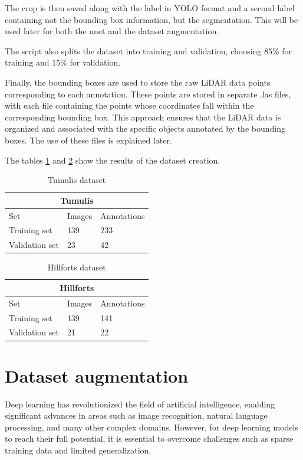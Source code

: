 The crop is then saved along with the label in YOLO format and a second label containing not the bounding box information, but the segmentation. This will be used later for both the unet and the dataset augmentation.

The script also splits the dataset into training and validation, choosing 85\% for training and 15\% for validation.

Finally, the bounding boxes are used to store the raw LiDAR data points corresponding to each annotation. These points are stored in separate .las files, with each file containing the points whose coordinates fall within the corresponding bounding box. This approach ensures that the LiDAR data is organized and associated with the specific objects annotated by the bounding boxes. The use of these files is explained later.

The tables \ref{table:tumulisDataset} and \ref{table:hillfortsDataset} show the results of the dataset creation.

\begin{table}[H]
\centering
\begin{tabular}{|p{3cm}|p{2.5cm}|p{2cm}|} 
\hline
\multicolumn{3}{|c|}{Tumulis} \\
 \hline
  Set & Images & Annotations\\ [0.5ex] 
 \hline
 Training set & 139 & 233 \\ 
 Validation set & 23 & 42  \\[1ex]
 \hline
\end{tabular}
\caption{Tumulis dataset}
\label{table:tumulisDataset}
\end{table} 

\begin{table}[H]
\centering
\begin{tabular}{|p{3cm}|p{2.5cm}|p{2cm}|} 
\hline
\multicolumn{3}{|c|}{Hillforts} \\
 \hline
  Set & Images & Annotations\\ [0.5ex] 
 \hline
 Training set & 139 & 141 \\ 
 Validation set & 21 & 22  \\[1ex]
 \hline
\end{tabular}
\caption{Hillforts dataset}
\label{table:hillfortsDataset}
\end{table} 


\section{Dataset augmentation}
Deep learning has revolutionized the field of artificial intelligence, enabling significant advances in areas such as image recognition, natural language processing, and many other complex domains. However, for deep learning models to reach their full potential, it is essential to overcome challenges such as sparse training data and limited generalization.

